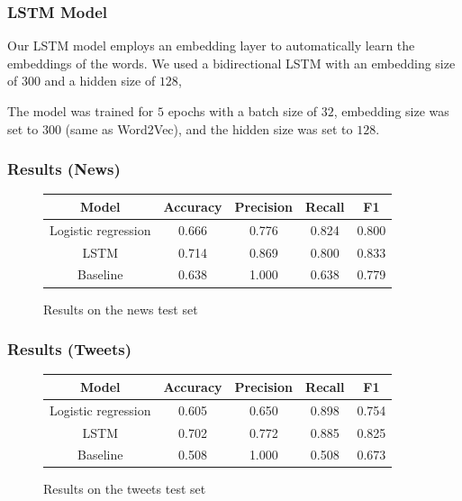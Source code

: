 \documentclass[english, xcolor={table,usenames}]{beamer}
\begin{document}
\begin{frame}
  \frametitle{LSTM Model}

  Our LSTM model employs an embedding layer to automatically learn the embeddings of the words. We used a bidirectional LSTM with an embedding size of $300$ and a hidden size of $128$,

  The model was trained for $5$ epochs with a batch size of $32$, embedding size was set to $300$ (same as Word2Vec), and the hidden size was set to $128$.

\end{frame}

\begin{frame}[fragile]
  \frametitle{Results (News)}

  \begin{figure}[h]
    \centering
    \caption{Results on the news test set}
    \begin{tabular}{|c|c|c|c|c|}
      \hline
      Model               & Accuracy & Precision & Recall & F1    \\
      \hline
      \hline
      Logistic regression & 0.666    & 0.776     & 0.824  & 0.800 \\
      LSTM                & 0.714    & 0.869     & 0.800  & 0.833 \\
      Baseline            & 0.638    & 1.000     & 0.638  & 0.779 \\
      \hline
    \end{tabular}
  \end{figure}

\end{frame}

\begin{frame}
  \frametitle{Results (Tweets)}

  \begin{figure}[h]
    \centering
    \caption{Results on the tweets test set}
    \begin{tabular}{|c|c|c|c|c|}
      \hline
      Model               & Accuracy & Precision & Recall & F1    \\
      \hline
      \hline
      Logistic regression & 0.605    & 0.650     & 0.898  & 0.754 \\
      LSTM                & 0.702    & 0.772     & 0.885  & 0.825 \\
      Baseline            & 0.508    & 1.000     & 0.508  & 0.673 \\
      \hline
    \end{tabular}
  \end{figure}
\end{frame}
\end{document}

